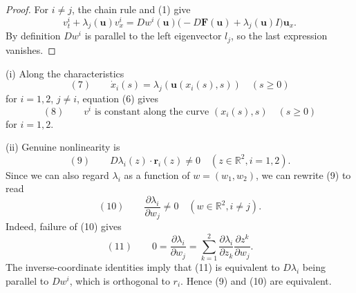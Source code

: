\begin{proof}
\sketch For $i\ne j$, the chain rule and (1) give
\[
v^i_t+\lambda_j(\mathbf u)v^i_x
=Dw^i(\mathbf u)\bigl(-D\mathbf F(\mathbf u)+\lambda_j(\mathbf u)I\bigr)\mathbf u_x.
\]
By definition $Dw^i$ is parallel to the left eigenvector $l_j$, so the last expression vanishes.
\end{proof}

\begin{remark}
\label{rem:riemann-invariant-characteristic-curves}

(i) Along the characteristics
$$(7) \qquad \dot x_i(s) = \lambda_j(\mathbf{u}(x_i(s),s)) \quad (s\geq 0)$$
for $i=1,2$, $j\neq i$, equation (6) gives
$$(8) \qquad v^i \text{ is constant along the curve } (x_i(s),s) \quad (s\geq 0)$$
for $i=1,2$.

(ii) Genuine nonlinearity is
$$(9) \qquad D\lambda_i(z)\cdot\mathbf{r}_i(z) \neq 0 \quad (z\in\mathbb{R}^2, i=1,2).$$
Since we can also regard $\lambda_i$ as a function of $w=(w_1,w_2)$, we can rewrite (9) to read
$$(10) \qquad \frac{\partial\lambda_i}{\partial w_j} \neq 0 \quad (w\in\mathbb{R}^2, i\neq j).$$
Indeed, failure of (10) gives
$$(11) \qquad 0 = \frac{\partial\lambda_i}{\partial w_j} = \sum_{k=1}^2 \frac{\partial\lambda_i}{\partial z_k}\frac{\partial z^k}{\partial w_j}.$$
The inverse-coordinate identities imply that (11) is equivalent to $D\lambda_i$ being parallel to $Dw^i$, which is orthogonal to $r_i$. Hence (9) and (10) are equivalent.
\end{remark}

